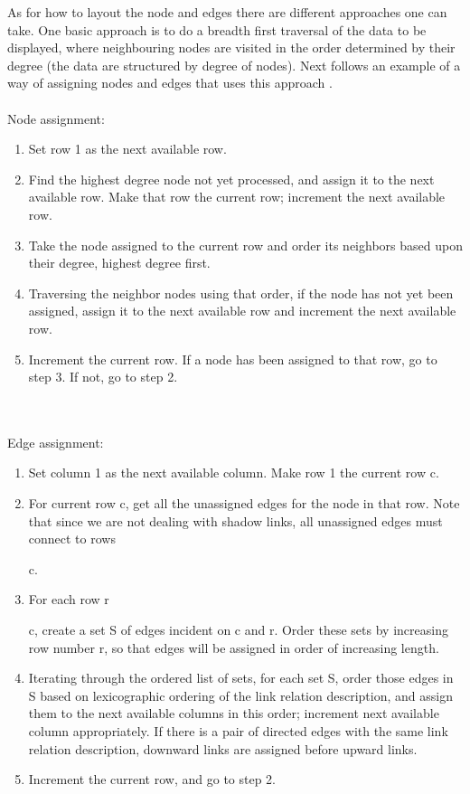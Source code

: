 \documentclass[a4paper,11pt]{kth-mag}
\begin{document}
As for how to layout the node and edges there are different approaches one can take. One basic approach is to do a breadth first traversal of the data to be displayed, where neighbouring nodes
are visited in the order determined by their degree (the data are structured by degree of nodes). Next follows an example of a way of assigning nodes and edges that uses this approach \cite{23102059}.
\\
\\
Node assignment:
\begin{enumerate}
	\item Set row 1 as the next available row.
	\item Find the highest degree node not yet processed, and
		  assign it to the next available row. Make that row the
		  current row; increment the next available row.
	\item Take the node assigned to the current row and
		  order its neighbors based upon their degree, highest
		  degree first.
	\item Traversing the neighbor nodes using that order, if the
		  node has not yet been assigned, assign it to the next
		  available row and increment the next available row.
	\item Increment the current row. If a node has been assigned
		  to that row, go to step 3. If not, go to step 2.
\end{enumerate}
\\
\\
Edge assignment:
\begin{enumerate}
	\item Set column 1 as the next available column. Make row
		  1 the current row c.
	\item For current row c, get all the unassigned edges for the
		  node in that row. Note that since we are not dealing
		  with shadow links, all unassigned edges must connect
		  to rows \begin{mathsurround} \math \ge \end{mathsurround} c.
	\item For each row r \begin{mathsurround} \math \ge \end{mathsurround} c, create a set S of edges incident on
		  c and r. Order these sets by increasing row number r,
		  so that edges will be assigned in order of increasing
		  length.
	\item Iterating through the ordered list of sets, for each set
		  S, order those edges in S based on lexicographic
		  ordering of the link relation description, and assign
		  them to the next available columns in this order;
		  increment next available column appropriately. If
		  there is a pair of directed edges with the same link
		  relation description, downward links are assigned
		  before upward links.
	\item Increment the current row, and go to step 2.
\end{enumerate}
\end{document}
